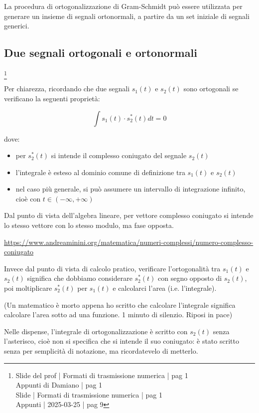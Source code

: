 La procedura di ortogonalizzazione di Gram-Schmidt può essere utilizzata per generare un insieme di segnali ortonormali, a partire da un set iniziale di segnali generici. \newline 

\newpage 

\subsection{Due segnali ortogonali e ortonormali}
\footnote{Slide del prof | Formati di trasmissione numerica | pag 1 \\  
Appunti di Damiano | pag 1 \\
Slide | Formati di trasmissione numerica | pag  1\\
Appunti | 2025-03-25 | pag 9
}

Per chiarezza, ricordando che due segnali $s_1 (t)$ e $s_2 (t)$ sono ortogonali se verificano la seguenti proprietà: 

{
    \Large 
    \begin{equation}
        \int s_1 (t) \cdot s_2^{*} (t) dt = 0
    \end{equation}
}

dove: 

\begin{itemize}
    \item per $s_2^{*} (t)$ si intende il complesso coniugato del segnale $s_2 (t)$ 
    \item l'integrale è esteso al dominio comune di definizione tra $s_1 (t)$ e $s_2 (t)$
    \item nel caso più generale, si può assumere un intervallo di integrazione infinito, cioè con $t \in (-\infty, + \infty)$
\end{itemize}

\begin{tcolorbox}
    Dal punto di vista dell'algebra lineare, per vettore complesso coniugato si intende lo stesso vettore con lo stesso modulo, ma fase opposta. \newline
    
    \url{https://www.andreaminini.org/matematica/numeri-complessi/numero-complesso-coniugato} \newline 

    Invece dal punto di vista di calcolo pratico, verificare l'ortogonalità tra $s_1 (t)$ e $s_2 (t)$ significa che  
    dobbiamo considerare $s_2 ^{*} (t)$ con segno opposto di $s_2 (t)$, poi moltiplicare $s_2 ^{*} (t)$ per $s_1 (t)$ e calcolarci l'area (i.e. l'integrale). \newline 
    
    (Un matematico è morto appena ho scritto che calcolare l'integrale significa calcolare l'area sotto ad una funzione. 1 minuto di silenzio. Riposi in pace) \newline 

    Nelle dispense, l'integrale di ortogonalizzazione è scritto con $s_2 (t)$ senza l'asterisco, cioè non si specifica che si intende il suo coniugato: è stato scritto senza per semplicità di notazione, 
    ma ricordatevelo di metterlo. 
\end{tcolorbox}

